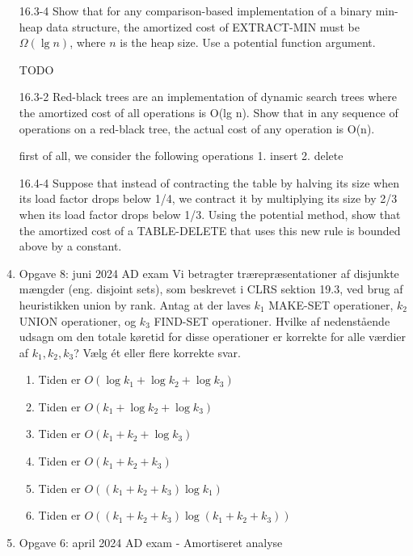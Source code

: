 \documentclass{article}
\theoremstyle{definition}
\begin{document}
\begin{enumerate}
    \item[16.3-4] Show that for any comparison-based implementation of a binary min-heap data structure, the amortized cost of EXTRACT-MIN must be $\Omega(\lg n)$, where $n$ is the heap size. Use a potential function argument.
    
    TODO
    
    \item[16.3-2] Red-black trees are an implementation of dynamic search trees where the amortized cost of all operations is O(lg n). Show that in any sequence of operations on a red-black tree, the actual cost of any operation is O(n).
    
    first of all, we consider the following operations
    1. insert
    2. delete
    
    \item[16.4-4] Suppose that instead of contracting the table by halving its size when its load factor drops below 1/4, we contract it by multiplying its size by 2/3 when its load factor drops below 1/3. Using the potential method, show that the amortized cost of a TABLE-DELETE that uses this new rule is bounded above by a constant.
    
    \item Opgave 8: juni 2024 AD exam
    Vi betragter trærepræsentationer af disjunkte mængder (eng. disjoint sets), som beskrevet i CLRS sektion 19.3, ved brug af heuristikken union by rank. Antag at der laves $k_1$ MAKE-SET operationer, $k_2$ UNION operationer, og $k_3$ FIND-SET operationer. Hvilke af nedenstående udsagn om den totale køretid for disse operationer er korrekte for alle værdier af $k_1, k_2, k_3$? Vælg ét eller flere korrekte svar.

    \begin{enumerate}
        \item Tiden er $O(\log k_1 + \log k_2 + \log k_3)$
        \item Tiden er $O(k_1 + \log k_2 + \log k_3)$
        \item Tiden er $O(k_1 + k_2 + \log k_3)$
        \item Tiden er $O(k_1 + k_2 + k_3)$
        \item Tiden er $O((k_1 + k_2 + k_3) \log k_1)$
        \item Tiden er $O((k_1 + k_2 + k_3) \log(k_1 + k_2 + k_3))$
    \end{enumerate}
    
    
    \item Opgave 6: april 2024 AD exam - Amortiseret analyse
    

\end{enumerate}
\end{document}
